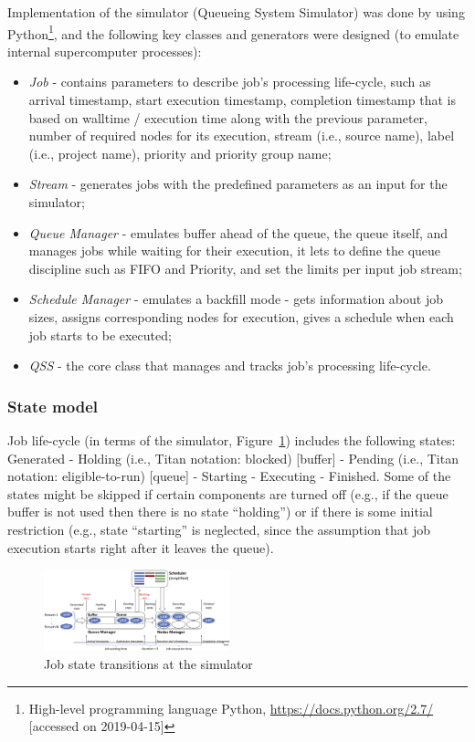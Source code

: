 Implementation of the simulator (Queueing System Simulator) \cite{ref-qss} was done by using Python\footnote{High-level programming language Python, \url{https://docs.python.org/2.7/} [accessed on 2019-04-15]}, and the following key classes and generators were designed (to emulate internal supercomputer processes): 
\begin{itemize}
    \item \textit{Job} - contains parameters to describe job's processing life-cycle, such as arrival timestamp, start execution timestamp, completion timestamp that is based on walltime / execution time along with the previous parameter, number of required nodes for its execution, stream (i.e., source name), label (i.e., project name), priority and priority group name;
    \item \textit{Stream} - generates jobs with the predefined parameters as an input for the simulator;
    \item \textit{Queue Manager} - emulates buffer ahead of the queue, the queue itself, and manages jobs while waiting for their execution, it lets to define the queue discipline such as FIFO and Priority, and set the limits per input job stream;
    \item \textit{Schedule Manager} - emulates a backfill mode - gets information about job sizes, assigns corresponding nodes for execution, gives a schedule when each job starts to be executed;
    \item \textit{QSS} - the core class that manages and tracks job's processing life-cycle.
\end{itemize}

\subsubsection{State model} \label{sec-strategy-3-2}

Job life-cycle (in terms of the simulator, Figure~\ref{fig-simulator-scheme}) includes the following states: Generated - Holding (i.e., Titan notation: blocked) [buffer] - Pending (i.e., Titan notation: eligible-to-run) [queue] - Starting - Executing - Finished. Some of the states might be skipped if certain components are turned off (e.g., if the queue buffer is not used then there is no state ``holding'') or if there is some initial restriction (e.g., state ``starting'' is neglected, since the assumption that job execution starts right after it leaves the queue).

\begin{figure}
    \centering
    \includegraphics[width=0.48\textwidth]{pics/simulator-scheme.png}
    \caption{Job state transitions at the simulator}
    \label{fig-simulator-scheme} 
\end{figure}
